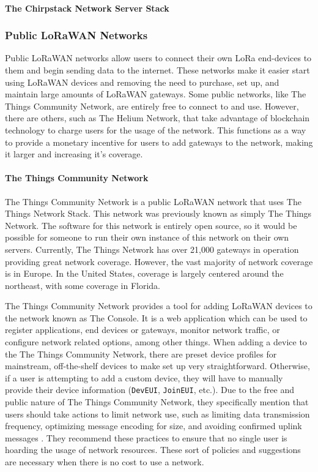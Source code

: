 \paragraph{The Chirpstack Network Server Stack}

\subsubsection{Public LoRaWAN Networks} \label{public-networks}
Public LoRaWAN networks allow users to connect their own LoRa end-devices to them and begin sending data to the internet. These networks make it easier start using LoRaWAN devices and removing the need to purchase, set up, and maintain large amounts of LoRaWAN gateways. Some public networks, like The Things Community Network, are entirely free to connect to and use. However, there are others, such as The Helium Network, that take advantage of blockchain technology to charge users for the usage of the network. This functions as a way to provide a monetary incentive for users to add gateways to the network, making it larger and increasing it's coverage.

\paragraph{The Things Community Network}
The Things Community Network is a public LoRaWAN network that uses The Things Network Stack. This network was previously known as simply The Things Network. The software for this network is entirely open source, so it would be possible for someone to run their own instance of this network on their own servers. Currently, The Things Network has over 21,000 gateways in operation providing great network coverage. However, the vast majority of network coverage is in Europe. In the United States, coverage is largely centered around the northeast, with some coverage in Florida.

The Things Community Network provides a tool for adding LoRaWAN devices to the network known as The Console. It is a web application which can be used to register applications, end devices or gateways, monitor network traffic, or configure network related options, among other things. When adding a device to the The Things Community Network, there are preset device profiles for mainstream, off-the-shelf devices to make set up very straightforward. Otherwise, if a user is attempting to add a custom device, they will have to manually provide their device information (\texttt{DevEUI}, \texttt{JoinEUI}, etc.). Due to the free and public nature of The Things Community Network, they specifically mention that users should take actions to limit network use, such as limiting data transmission frequency, optimizing message encoding for size, and avoiding confirmed uplink messages \cite{the-things-network}. They recommend these practices to ensure that no single user is hoarding the usage of network resources. These sort of policies and suggestions are necessary when there is no cost to use a network.

